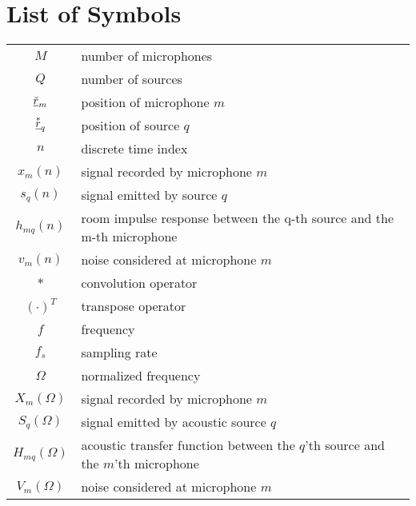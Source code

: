 \chapter*{List of Symbols}

\begin{tabular}{cp{}}
  $M$ & number of  microphones \\
  $Q$ & number of sources \\
  $\underline{\breve{r}}_m$ & position of microphone $m$  \\
  $\vect {\oast r}_q$ & position of source $q$\\
  $n$ & discrete time index \\
  $x_m(n)$ & signal recorded by microphone $m$\\
  $s_q(n)$ & signal emitted by source $q$ \\
  $h_{mq}(n)$ & room impulse response between the q-th source and the m-th microphone \\
  $v_m(n)$    & noise considered at microphone $m$ \\
  $*$ & convolution operator\\
  $(\cdot)^T$        & transpose operator\\
  $f$ & frequency \\
  $f_s$ & sampling rate \\
  $\Omega$ & normalized frequency \\
  $X_m(\Omega)$ & signal recorded by microphone $m$\\
  $S_q(\Omega)$ & signal emitted by acoustic source $q$\\
  $H_{mq}(\Omega)$ & acoustic transfer function between the $q$'th source and the $m$'th microphone\\
  $V_m(\Omega)$ & noise considered at microphone $m$\\

\end{tabular}
